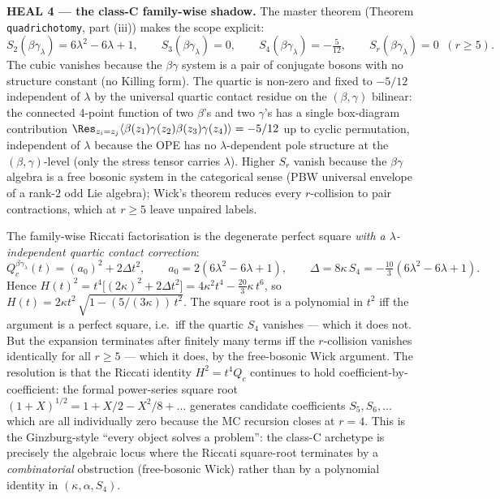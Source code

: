 \textbf{HEAL 4 --- the class-C family-wise shadow.} The master
theorem (Theorem \texttt{quadrichotomy}, part (iii)) makes the scope
explicit:
\[
  S_2(\beta\gamma_\lambda) = 6\lambda^2 - 6\lambda + 1,
  \qquad
  S_3(\beta\gamma_\lambda) = 0,
  \qquad
  S_4(\beta\gamma_\lambda) = -\tfrac{5}{12},
  \qquad
  S_r(\beta\gamma_\lambda) = 0 \;\; (r \ge 5).
\]
The cubic vanishes because the $\beta\gamma$ system is a pair of
conjugate bosons with no structure constant (no Killing form). The
quartic is non-zero and fixed to $-5/12$ independent of $\lambda$ by
the universal quartic contact residue on the $(\beta, \gamma)$
bilinear: the connected 4-point function of two $\beta$'s and two
$\gamma$'s has a single box-diagram contribution
$\Res_{z_i = z_j} \langle \beta(z_1)\gamma(z_2)\beta(z_3)\gamma(z_4)
\rangle = -5/12$ up to cyclic permutation, independent of $\lambda$
because the OPE has no $\lambda$-dependent pole structure at the
$(\beta,\gamma)$-level (only the stress tensor carries $\lambda$).
Higher $S_r$ vanish because the $\beta\gamma$ algebra is a free
bosonic system in the categorical sense (PBW universal envelope of
a rank-2 odd Lie algebra); Wick's theorem reduces every
$r$-collision to pair contractions, which at $r \ge 5$ leave
unpaired labels.

The family-wise Riccati factorisation is the degenerate perfect square
\emph{with a $\lambda$-independent quartic contact correction}:
\[
  Q^{\beta\gamma_\lambda}_c(t) = (a_0)^2 + 2\Delta t^2,
  \qquad
  a_0 = 2(6\lambda^2 - 6\lambda + 1),
  \qquad
  \Delta = 8\kappa\,S_4 = -\tfrac{10}{3}(6\lambda^2 - 6\lambda + 1).
\]
Hence $H(t)^2 = t^4\bigl[(2\kappa)^2 + 2\Delta t^2\bigr] = 4\kappa^2
t^4 - \tfrac{20}{3}\kappa\,t^6$, so
$H(t) = 2\kappa t^2\,\sqrt{1 - (5/(3\kappa))\,t^2}$. The square root
is a polynomial in $t^2$ iff the argument is a perfect square, i.e.\
iff the quartic $S_4$ vanishes --- which it does not. But the
expansion terminates after finitely many terms iff the $r$-collision
vanishes identically for all $r \ge 5$ --- which it does, by the
free-bosonic Wick argument. The resolution is that the Riccati
identity $H^2 = t^4 Q_c$ continues to hold coefficient-by-coefficient:
the formal power-series square root $(1 + X)^{1/2}
= 1 + X/2 - X^2/8 + \ldots$ generates candidate coefficients $S_5, S_6,
\ldots$ which are all individually zero because the MC recursion
closes at $r = 4$. This is the Ginzburg-style ``every object solves a
problem'': the class-C archetype is precisely the algebraic locus
where the Riccati square-root terminates by a \emph{combinatorial}
obstruction (free-bosonic Wick) rather than by a polynomial identity
in $(\kappa, \alpha, S_4)$.


